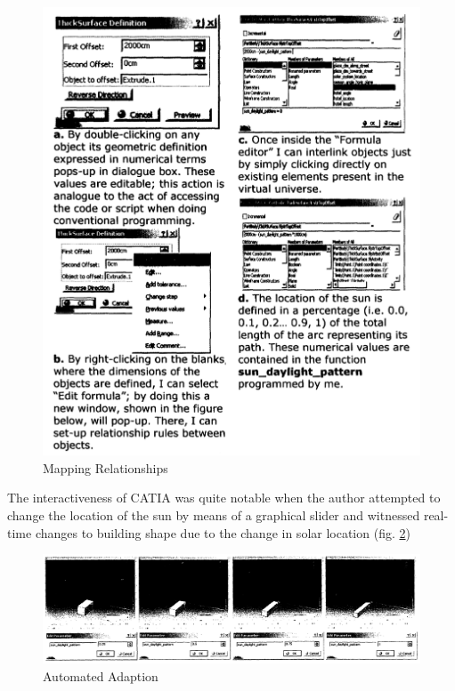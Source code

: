\begin{figure}[htbp]
\centering
\includegraphics[width=\textwidth]{./Images/5-MappingRelations}
\caption[Mapping Design Relations]{Mapping Relationships \cite{zulas04}}
\label{fig:MpRlt}
\end{figure}

The interactiveness of CATIA was quite notable when the author attempted to change the location of the sun by means of a graphical slider and witnessed real-time changes to building shape due to the change in solar location (fig. \ref{fig:IntActCAT})

\begin{figure}[htbp]
\centering
\includegraphics[width=\textwidth]{./Images/6-InteractiveCATIA}
\caption[Interactive Response]{Automated Adaption \cite{zulas04}}
\label{fig:IntActCAT}
\end{figure}

